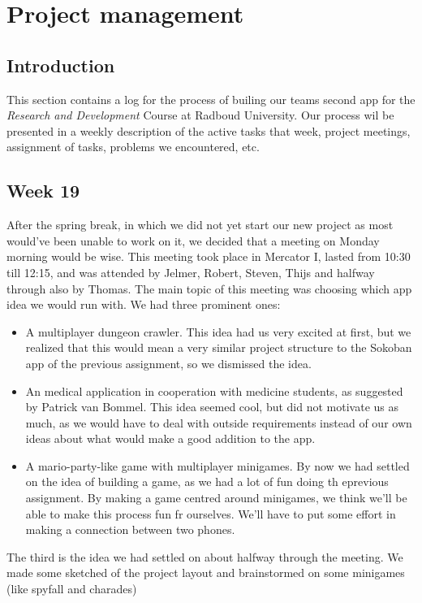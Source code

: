 \documentclass[../main.tex]{subfiles}
\begin{document}
\pagebreak
\section{Project management}
\subsection*{Introduction}
This section contains a log for the process of builing our teams second app for the \textit{Research and Development} Course at Radboud University.
Our process wil be presented in a weekly description of the active tasks that week, project meetings, assignment of tasks, problems we encountered, etc.

\subsection*{Week 19}
After the spring break, in which we did not yet start our new project as most would've been unable to work on it, we decided that a meeting on Monday morning would be wise. This meeting took place in Mercator I, lasted from 10:30 till 12:15, and was attended by Jelmer, Robert, Steven, Thijs and halfway through also by Thomas.
The main topic of this meeting was choosing which app idea we would run with. We had three prominent ones:
\begin{itemize}
	\item A multiplayer dungeon crawler. This idea had us very excited at first, but we realized that this would mean a very similar project structure to the Sokoban app of the previous assignment, so we dismissed the idea.
	\item An medical application in cooperation with medicine students, as suggested by Patrick van Bommel. This idea seemed cool, but did not motivate us as much, as we would have to deal with outside requirements instead of our own ideas about what would make a good addition to the app.
	\item A mario-party-like game with multiplayer minigames. By now we had settled on the idea of building a game, as we had a lot of fun doing th eprevious assignment. By making a game centred around minigames, we think we'll be able to make this process fun fr ourselves. We'll have to put some effort in making a connection between two phones.
\end{itemize}

The third is the idea we had settled on about halfway through the meeting. We made some sketched of the project layout and brainstormed on some minigames (like spyfall and charades)
\end{document}
